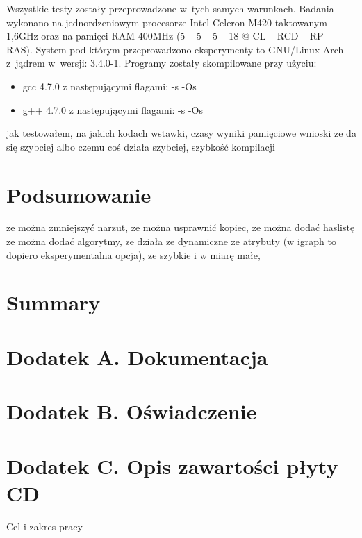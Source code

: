 \documentclass[a4paper,12pt,polish,oneside]{thesis}
\begin{document}
Wszystkie testy zostały przeprowadzone w~tych samych warunkach.
Badania wykonano na jednordzeniowym procesorze Intel Celeron M420 taktowanym 1,6GHz oraz na pamięci RAM 400MHz (5 -- 5 -- 5 -- 18 @ CL -- RCD -- RP -- RAS).
System pod którym przeprowadzono eksperymenty to GNU/Linux Arch z~jądrem w~wersji: 3.4.0-1.
Programy zostały skompilowane przy użyciu:
\begin{itemize}
	\item gcc 4.7.0 z następującymi flagami: -s -Os
	\item g++ 4.7.0 z następującymi flagami: -s -Os
\end{itemize}

jak testowałem, na jakich kodach wstawki, czasy wyniki pamięciowe wnioski ze da się szybciej albo czemu coś działa szybciej, szybkość kompilacji
\chapter*{Podsumowanie}
ze można zmniejszyć narzut, ze można usprawnić kopiec, ze można dodać haslistę  ze można dodać algorytmy, 
   ze działa ze dynamiczne ze atrybuty (w igraph to dopiero eksperymentalna opcja), ze szybkie i w miarę małe, 
\chapter*{Summary}

\chapter*{Dodatek A. Dokumentacja}
\chapter*{Dodatek B. Oświadczenie}
\chapter*{Dodatek C. Opis zawartości płyty CD}
Cel i zakres pracy\cite{bib:test}

\listoffigures
\listoftables
\lstlistoflistings
\end{document}
